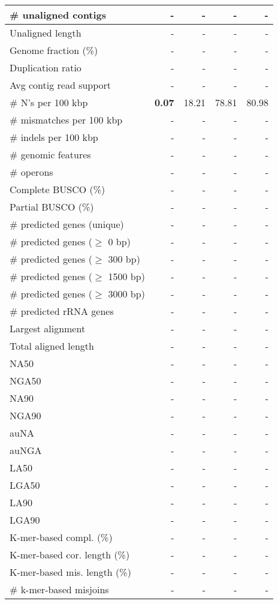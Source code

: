 \documentclass[12pt,a4paper]{article}
\begin{document}
\begin{table}[ht]
\begin{center}
\begin{tabular}{|l*{4}{|r}|}
\# unaligned contigs & - & - & - & - \\ \hline
Unaligned length & - & - & - & - \\ \hline
Genome fraction (\%) & - & - & - & - \\ \hline
Duplication ratio & - & - & - & - \\ \hline
Avg contig read support & - & - & - & - \\ \hline
\# N's per 100 kbp & {\bf 0.07} & 18.21 & 78.81 & 80.98 \\ \hline
\# mismatches per 100 kbp & - & - & - & - \\ \hline
\# indels per 100 kbp & - & - & - & - \\ \hline
\# genomic features & - & - & - & - \\ \hline
\# operons & - & - & - & - \\ \hline
Complete BUSCO (\%) & - & - & - & - \\ \hline
Partial BUSCO (\%) & - & - & - & - \\ \hline
\# predicted genes (unique) & - & - & - & - \\ \hline
\# predicted genes ($\geq$ 0 bp) & - & - & - & - \\ \hline
\# predicted genes ($\geq$ 300 bp) & - & - & - & - \\ \hline
\# predicted genes ($\geq$ 1500 bp) & - & - & - & - \\ \hline
\# predicted genes ($\geq$ 3000 bp) & - & - & - & - \\ \hline
\# predicted rRNA genes & - & - & - & - \\ \hline
Largest alignment & - & - & - & - \\ \hline
Total aligned length & - & - & - & - \\ \hline
NA50 & - & - & - & - \\ \hline
NGA50 & - & - & - & - \\ \hline
NA90 & - & - & - & - \\ \hline
NGA90 & - & - & - & - \\ \hline
auNA & - & - & - & - \\ \hline
auNGA & - & - & - & - \\ \hline
LA50 & - & - & - & - \\ \hline
LGA50 & - & - & - & - \\ \hline
LA90 & - & - & - & - \\ \hline
LGA90 & - & - & - & - \\ \hline
K-mer-based compl. (\%) & - & - & - & - \\ \hline
K-mer-based cor. length (\%) & - & - & - & - \\ \hline
K-mer-based mis. length (\%) & - & - & - & - \\ \hline
\# k-mer-based misjoins & - & - & - & - \\ \hline
\end{tabular}
\end{center}
\end{table}
\end{document}
